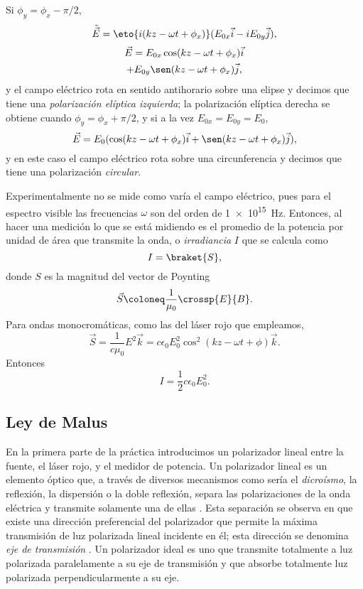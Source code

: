 Si $\phi_y = \phi_x - \pi/2$,
\begin{equation}\label{eq: elliptical}
    \tilde{\vec E} = \eto{i(kz - \omega t + \phi_x)}(E_{0x}  \vec i - i E_{0y}  \vec j),
\end{equation}
\begin{multline}
    \vec E = E_{0x}\cos(kz - \omega t + \phi_x)\vec i\\
    + E_{0y}\sen(kz - \omega t + \phi_x)\vec j,
\end{multline}
y el campo eléctrico rota en sentido antihorario sobre una elipse y decimos que tiene una \emph{polarización elíptica izquierda}; la polarización elíptica derecha se obtiene cuando $\phi_y = \phi_x + \pi/2$, y si a la vez $E_{0x} = E_{0y} = E_0$,
\begin{equation}
    \vec E = E_0(\cos(kz - \omega t + \phi_x) \vec i + \sen(kz - \omega t + \phi_x)  \vec j),
\end{equation}
y en este caso el campo eléctrico rota sobre una circunferencia y decimos que tiene una polarización \emph{circular}.

Experimentalmente no se mide como varía el campo eléctrico, pues para el espectro visible las frecuencias $\omega$ son del orden de \qty{1e15}{\Hz}. Entonces, al hacer una medición lo que se está midiendo es el promedio de la potencia por unidad de área que transmite la onda, o \emph{irradiancia} $I$ que se calcula como
\begin{equation}
    I = \braket{S},
\end{equation}
donde $S$ es la magnitud del vector de Poynting
\begin{equation}
    \vec S \coloneq \frac{1}{\mu_0} \crossp{E}{B}.
\end{equation}
Para ondas monocromáticas, como las del láser rojo que empleamos,
\begin{equation}
    \vec S = \frac{1}{c\mu_0} E^2 \vec k = c\epsilon_0 E_0^2 \cos^2(kz - \omega t + \phi) \vec k.
\end{equation}
Entonces
\begin{equation}\label{eq: irradiance}
    I = \frac12 c\epsilon_0 E_0^2.
\end{equation}

\subsection{Ley de Malus}

En la primera parte de la práctica introducimos un polarizador lineal entre la fuente, el láser rojo, y el medidor de potencia. Un polarizador lineal es un elemento óptico que, a través de diversos mecanismos como sería el \emph{dicroísmo}, la reflexión, la dispersión o la doble reflexión, separa las polarizaciones de la onda eléctrica y transmite solamente una de ellas \parencite{hecht-1999}. Esta separación se observa en que existe una dirección preferencial del polarizador que permite la máxima transmisión de luz polarizada lineal incidente en él; esta dirección se denomina \emph{eje de transmisión} \parencite{fowles-1989}. Un polarizador ideal es uno que transmite totalmente a luz polarizada paralelamente a su eje de transmisión y que absorbe totalmente luz polarizada perpendicularmente a su eje.

